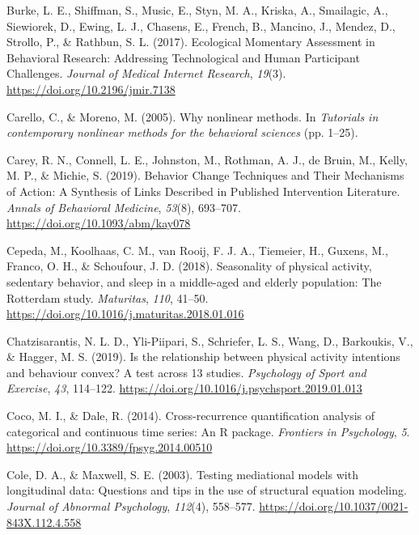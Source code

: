 \documentclass[
  british,
  man,floatsintext]{apa6}
\begin{document}
\leavevmode\hypertarget{ref-burkeEcologicalMomentaryAssessment2017}{}%
Burke, L. E., Shiffman, S., Music, E., Styn, M. A., Kriska, A., Smailagic, A., Siewiorek, D., Ewing, L. J., Chasens, E., French, B., Mancino, J., Mendez, D., Strollo, P., \& Rathbun, S. L. (2017). Ecological Momentary Assessment in Behavioral Research: Addressing Technological and Human Participant Challenges. \emph{Journal of Medical Internet Research}, \emph{19}(3). \url{https://doi.org/10.2196/jmir.7138}

\leavevmode\hypertarget{ref-carelloWhyNonlinearMethods2005}{}%
Carello, C., \& Moreno, M. (2005). Why nonlinear methods. In \emph{Tutorials in contemporary nonlinear methods for the behavioral sciences} (pp. 1--25).

\leavevmode\hypertarget{ref-careyBehaviorChangeTechniques2019}{}%
Carey, R. N., Connell, L. E., Johnston, M., Rothman, A. J., de Bruin, M., Kelly, M. P., \& Michie, S. (2019). Behavior Change Techniques and Their Mechanisms of Action: A Synthesis of Links Described in Published Intervention Literature. \emph{Annals of Behavioral Medicine}, \emph{53}(8), 693--707. \url{https://doi.org/10.1093/abm/kay078}

\leavevmode\hypertarget{ref-cepedaSeasonalityPhysicalActivity2018}{}%
Cepeda, M., Koolhaas, C. M., van Rooij, F. J. A., Tiemeier, H., Guxens, M., Franco, O. H., \& Schoufour, J. D. (2018). Seasonality of physical activity, sedentary behavior, and sleep in a middle-aged and elderly population: The Rotterdam study. \emph{Maturitas}, \emph{110}, 41--50. \url{https://doi.org/10.1016/j.maturitas.2018.01.016}

\leavevmode\hypertarget{ref-chatzisarantisRelationshipPhysicalActivity2019}{}%
Chatzisarantis, N. L. D., Yli-Piipari, S., Schriefer, L. S., Wang, D., Barkoukis, V., \& Hagger, M. S. (2019). Is the relationship between physical activity intentions and behaviour convex? A test across 13 studies. \emph{Psychology of Sport and Exercise}, \emph{43}, 114--122. \url{https://doi.org/10.1016/j.psychsport.2019.01.013}

\leavevmode\hypertarget{ref-cocoCrossrecurrenceQuantificationAnalysis2014}{}%
Coco, M. I., \& Dale, R. (2014). Cross-recurrence quantification analysis of categorical and continuous time series: An R package. \emph{Frontiers in Psychology}, \emph{5}. \url{https://doi.org/10.3389/fpsyg.2014.00510}

\leavevmode\hypertarget{ref-coleTestingMediationalModels2003}{}%
Cole, D. A., \& Maxwell, S. E. (2003). Testing mediational models with longitudinal data: Questions and tips in the use of structural equation modeling. \emph{Journal of Abnormal Psychology}, \emph{112}(4), 558--577. \url{https://doi.org/10.1037/0021-843X.112.4.558}
\end{document}
